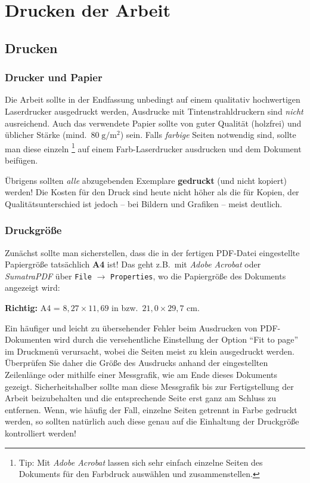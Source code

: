 \chapter{Drucken der Arbeit}
\label{chap:Drucken}



\section{Drucken}

\subsection{Drucker und Papier}

Die Arbeit sollte in der Endfassung unbedingt auf einem
qualitativ hochwertigen Laserdrucker ausgedruckt werden, Ausdrucke
mit Tintenstrahldruckern sind \emph{nicht} ausreichend. Auch das
verwendete Papier sollte von guter Qualität (holzfrei) und
üblicher Stärke (mind.\ $80\; {\mathrm g} / {\mathrm m}^2$) sein.
Falls \emph{farbige} Seiten notwendig sind, sollte man diese einzeln%
\footnote{Tip: Mit \emph{Adobe Acrobat} lassen sich sehr einfach einzelne Seiten
des Dokuments für den Farbdruck auswählen und zusammenstellen.}
auf einem Farb-Laserdrucker ausdrucken und dem Dokument beifügen.

Übrigens sollten \emph{alle} abzugebenden Exemplare {\bf
gedruckt} (und nicht kopiert) werden! Die Kosten für den Druck
sind heute nicht höher als die für Kopien, der
Qualitätsunterschied ist jedoch --  bei Bildern und Grafiken
-- meist deutlich.


\subsection{Druckgröße}

Zunächst sollte man sicherstellen, dass die in der fertigen PDF-Datei eingestellte
Papiergröße tatsächlich \textbf{A4} ist! Das geht z.B.\ mit \emph{Adobe Acrobat}
oder \emph{SumatraPDF}
über \texttt{File} $\rightarrow$ \texttt{Properties},
wo die Papiergröße des Dokuments angezeigt wird:
\begin{center}
\textbf{Richtig:} A4 = $8{,}27 \times 11{,}69$ in bzw.\ $21{,}0 \times 29{,}7$ cm.
\end{center}

Ein häufiger und leicht zu übersehender Fehler beim Ausdrucken von
PDF-Dokumenten wird durch die versehentliche Einstellung der
Option "`Fit to page"' im Druckmenü verursacht, wobei die Seiten
meist zu klein ausgedruckt werden. Überprüfen Sie daher die Größe
des Ausdrucks anhand der eingestellten Zeilenlänge oder mithilfe
einer Messgrafik, wie am Ende dieses Dokuments gezeigt.
Sicherheitshalber sollte man diese Messgrafik bis zur
Fertigstellung der Arbeit beizubehalten und die entsprechende
Seite erst ganz am Schluss zu entfernen.
Wenn, wie häufig der Fall, einzelne Seiten getrennt in Farbe gedruckt 
werden, so sollten natürlich auch diese genau auf die Einhaltung der Druckgröße 
kontrolliert werden!




